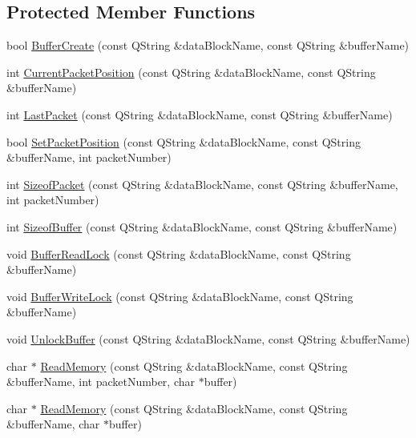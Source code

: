 \subsection*{\-Protected \-Member \-Functions}
\begin{DoxyCompactItemize}
\item 
bool \hyperlink{classGRIMemoryManager_a4e2a3746b3e90f628507a273247d7beb}{\-Buffer\-Create} (const \-Q\-String \&data\-Block\-Name, const \-Q\-String \&buffer\-Name)
\item 
int \hyperlink{classGRIMemoryManager_a8af8fbf63d97d606ba50fd48ad80fc49}{\-Current\-Packet\-Position} (const \-Q\-String \&data\-Block\-Name, const \-Q\-String \&buffer\-Name)
\item 
int \hyperlink{classGRIMemoryManager_acc4a1a2b6ea1813666534f6a9f5dbd37}{\-Last\-Packet} (const \-Q\-String \&data\-Block\-Name, const \-Q\-String \&buffer\-Name)
\item 
bool \hyperlink{classGRIMemoryManager_aa54e3277f55cd1b11bc705d0e4e837be}{\-Set\-Packet\-Position} (const \-Q\-String \&data\-Block\-Name, const \-Q\-String \&buffer\-Name, int packet\-Number)
\item 
int \hyperlink{classGRIMemoryManager_a0ad9fa754a69205000fe3167d36ad74d}{\-Sizeof\-Packet} (const \-Q\-String \&data\-Block\-Name, const \-Q\-String \&buffer\-Name, int packet\-Number)
\item 
int \hyperlink{classGRIMemoryManager_a68bae784b1881977891df807337f358f}{\-Sizeof\-Buffer} (const \-Q\-String \&data\-Block\-Name, const \-Q\-String \&buffer\-Name)
\item 
void \hyperlink{classGRIMemoryManager_a895ce3a82d56ecee039ea5cba4ef9ced}{\-Buffer\-Read\-Lock} (const \-Q\-String \&data\-Block\-Name, const \-Q\-String \&buffer\-Name)
\item 
void \hyperlink{classGRIMemoryManager_a8e02ecbc040cd8e0baebb0700cbe53e8}{\-Buffer\-Write\-Lock} (const \-Q\-String \&data\-Block\-Name, const \-Q\-String \&buffer\-Name)
\item 
void \hyperlink{classGRIMemoryManager_a33e54c038504e7ca5acb9a613b2e73a5}{\-Unlock\-Buffer} (const \-Q\-String \&data\-Block\-Name, const \-Q\-String \&buffer\-Name)
\item 
char $\ast$ \hyperlink{classGRIMemoryManager_a0e1331c7db271c3dda06f2733c7b527b}{\-Read\-Memory} (const \-Q\-String \&data\-Block\-Name, const \-Q\-String \&buffer\-Name, int packet\-Number, char $\ast$buffer)
\item 
char $\ast$ \hyperlink{classGRIMemoryManager_a0966d9e38a4959b69391f4cd71026ecf}{\-Read\-Memory} (const \-Q\-String \&data\-Block\-Name, const \-Q\-String \&buffer\-Name, char $\ast$buffer)

\end{DoxyCompactItemize}

